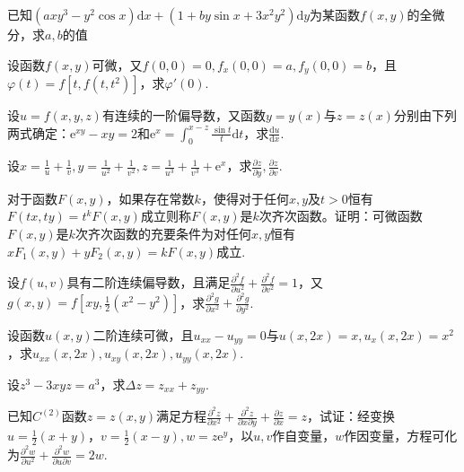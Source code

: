 \begin{xiti}
	\item 已知$\left(a x y^{3}-y^{2} \cos x\right) \mathrm{d} x+\left(1+b y \sin x+3 x^{2} y^{2}\right) \mathrm{d} y$为某函数$f(x,y)$的全微分，求$a,b$的值
	\item 设函数$f(x,y)$可微，又$f(0,0)=0, f_{x}(0,0)=a, f_{y}(0,0)=b$，且$\varphi(t)=f\left[t, f\left(t, t^{2}\right)\right]$，求$\varphi'(0)$.
	\item 设$u=f(x,y,z)$有连续的一阶偏导数，又函数$y=y(x)$与$z=z(x)$分别由下列两式确定：$\mathrm{e}^{x y}-x y=2$和$\mathrm{e}^{x}=\int_{0}^{x-z} \frac{\sin t}{t} \mathrm{d} t$，求$\frac{\mathrm{d} u}{\mathrm{d} x}$.
	\item 设$x=\frac{1}{u}+\frac{1}{v},  y=\frac{1}{u^{2}}+\frac{1}{v^{2}}, z=\frac{1}{u^{3}}+\frac{1}{v^{3}}+\mathrm{e}^{x}$，求$\frac{\partial z}{\partial y}, \frac{\partial z}{\partial v}$.
	\item 对于函数$F(x,y)$，如果存在常数$k$，使得对于任何$x,y$及$t>0$恒有$F(t x, t y)=t^{k} F(x, y)$成立则称$F(x,y)$是$k$次齐次函数。证明：可微函数$F(x,y)$是$k$次齐次函数的充要条件为对任何$x,y$恒有$x F_{1}(x, y)+y F_{2}(x, y)=k F(x, y)$成立.
	\item 设$f(u,v)$具有二阶连续偏导数，且满足$\frac{\partial^{2} f}{\partial u^{2}}+\frac{\partial^{2} f}{\partial v^{2}}=1$，又$g(x, y)=f\left[x y, \frac{1}{2}\left(x^{2}-y^{2}\right)\right]$，求$\frac{\partial^{2} g}{\partial x^{2}}+\frac{\partial^{2} g}{\partial y^{2}}$.
	\item 设函数$u(x,y)$二阶连续可微，且$u_{x x}-u_{y y}=0$与$u(x, 2 x)=x, u_{x}(x, 2 x)=x^{2}$，求$u_{x x}(x, 2 x), u_{x y}(x, 2 x), u_{y y}(x, 2 x)$.
	\item 设$z^{3}-3 x y z=a^{3}$，求$\Delta z=z_{x x}+z_{y y}$.
	\item 已知$C^{(2)}$函数$z=z(x, y)$满足方程$\frac{\partial^{2} z}{\partial x^{2}}+\frac{\partial^{2} z}{\partial x \partial y}+\frac{\partial z}{\partial x}=z$，试证：经变换$u=\frac{1}{2}(x+y)$，$v=\frac{1}{2}(x-y), w=z \mathrm{e}^{y}$，以$u,v$作自变量，$w$作因变量，方程可化为$\frac{\partial^{2} w}{\partial u^{2}}+\frac{\partial^{2} w}{\partial u \partial v}=2 w$.
\end{xiti}

